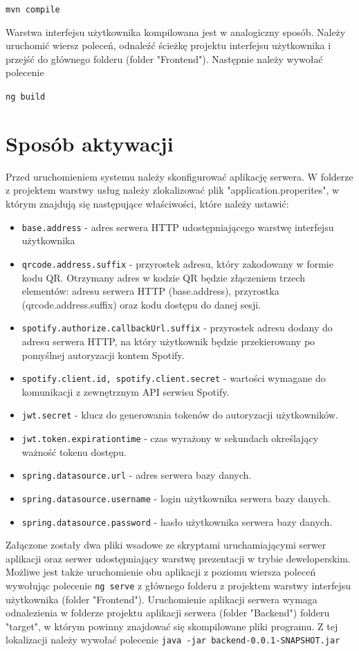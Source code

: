 \lstinline|mvn compile|


Warstwa interfejsu użytkownika kompilowana jest w analogiczny sposób. Należy uruchomić wiersz poleceń, odnaleźć ścieżkę projektu interfejsu użytkownika i przejść do głównego folderu (folder "Frontend"). Następnie należy wywołać polecenie

\lstinline|ng build|



\section{Sposób aktywacji}
Przed uruchomieniem systemu należy skonfigurować aplikację serwera. W folderze z projektem warstwy usług należy zlokalizować plik "application.properites", w którym znajdują się następujące właściwości, które należy ustawić:
\begin{itemize}
\item \lstinline|base.address| - adres serwera HTTP udostępniającego warstwę interfejsu użytkownika
\item \lstinline|qrcode.address.suffix| - przyrostek adresu, który zakodowany w formie kodu QR. Otrzymany adres w kodzie QR będzie złączeniem trzech elementów: adresu serwera HTTP (base.address), przyrostka (qrcode.address.suffix) oraz kodu dostępu do danej sesji.
\item \lstinline|spotify.authorize.callbackUrl.suffix| - przyrostek adresu dodany do adresu serwera HTTP, na który użytkownik będzie przekierowany po pomyślnej autoryzacji kontem Spotify.
\item \lstinline|spotify.client.id, spotify.client.secret| -  wartości wymagane do komunikacji z zewnętrznym API serwisu Spotify.
\item \lstinline|jwt.secret| - klucz do generowania tokenów do autoryzacji użytkowników.
\item \lstinline|jwt.token.expirationtime| - czas wyrażony w sekundach określający ważność tokenu dostępu.
\item \lstinline|spring.datasource.url| - adres serwera bazy danych.
\item \lstinline|spring.datasource.username| - login użytkownika serwera bazy danych.
\item \lstinline|spring.datasource.password| - hasło użytkownika serwera bazy danych.
\end{itemize}

Załączone zostały dwa pliki wsadowe ze skryptami uruchamiającymi serwer aplikacji oraz serwer udostępniający warstwę prezentacji w trybie deweloperskim. Możliwe jest także uruchomienie obu aplikacji z poziomu wiersza poleceń wywołując polecenie 
\lstinline|ng serve| z głównego folderu z projektem warstwy interfejsu użytkownika (folder "Frontend").
Uruchomienie aplikacji serwera wymaga odnalezienia w folderze projektu aplikacji serwera (folder "Backend") folderu "target", w którym powinny znajdować się skompilowane pliki programu. Z tej lokalizacji należy wywołać polecenie \lstinline|java -jar backend-0.0.1-SNAPSHOT.jar|

